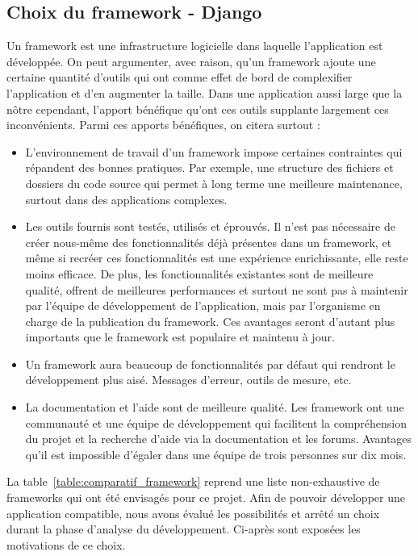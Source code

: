 \documentclass{EPL-master-thesis-covers-FR}
\begin{document}
			\subsection*{Choix du framework - Django}

				Un framework est une infrastructure logicielle dans laquelle l'application est développée. On peut argumenter, avec raison, qu'un framework ajoute une certaine quantité d'outils qui ont comme effet de bord de complexifier l'application et d'en augmenter la taille. Dans une application aussi large que la nôtre cependant, l'apport bénéfique qu'ont ces outils supplante largement ces inconvénients. Parmi ces apports bénéfiques, on citera surtout :
				\begin{itemize}
					\item L'environnement de travail d'un framework impose certaines contraintes qui répandent des bonnes pratiques. Par exemple, une structure des fichiers et dossiers du code source qui permet à long terme une meilleure maintenance, surtout dans des applications complexes.
					\item Les outils fournis sont testés, utilisés et éprouvés. Il n'est pas nécessaire de créer nous-même des fonctionnalités déjà présentes dans un framework, et même si recréer ces fonctionnalités est une expérience enrichissante, elle reste moins efficace. De plus, les fonctionnalités existantes sont de meilleure qualité, offrent de meilleures performances et surtout ne sont pas à maintenir par l'équipe de développement de l'application, mais par l'organisme en charge de la publication du framework. Ces avantages seront d'autant plus importants que le framework est populaire et maintenu à jour.
					\item Un framework aura beaucoup de fonctionnalités par défaut qui rendront le développement plus aisé. Messages d'erreur, outils de mesure, etc.
					\item La documentation et l'aide sont de meilleure qualité. Les framework ont une communauté et une équipe de développement qui facilitent la compréhension du projet et la recherche d'aide via la documentation et les forums. Avantages qu'il est impossible d'égaler dans une équipe de trois personnes sur dix mois.
				\end{itemize}

				La table~\ref{table:comparatif_framework} reprend une liste non-exhaustive de frameworks qui ont été envisagés pour ce projet. Afin de pouvoir développer une application compatible, nous avons évalué les possibilités et arrêté un choix durant la phase d'analyse du développement. Ci-après sont exposées les motivations de ce choix.
\end{document}

